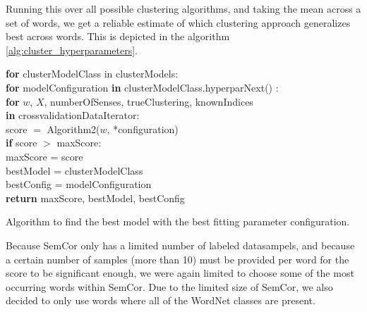 \documentclass[a4paper,12pt,oneside,openright]{report}
\begin{document}
\hfill \break

Running this over all possible clustering algorithms, and taking the mean across a set of words, we get a reliable estimate of which clustering approach generalizes best across words.
This is depicted in the algorithm \ref{alg:cluster_hyperparameters}.

\begin{algorithm}[H]
\SetAlgoLined
{}

\textbf{for} clusterModelClass in clusterModels:  \\
\quad \quad \textbf{for} modelConfiguration \textbf{in} clusterModelClass.hyperparNext() :  \\
\quad \quad \quad \quad \textbf{for} $w$, $X$, numberOfSenses, trueClustering, knownIndices \\
\quad \quad \quad \quad \textbf{in} crossvalidationDataIterator:  \\

\quad \quad \quad \quad \quad \quad score $=$ Algorithm2($w$, *configuration) \\
\quad \quad \quad \quad \quad \quad \textbf{if} score $>$ maxScore: \\
\quad \quad \quad \quad \quad \quad \quad \quad  maxScore = score \\
\quad \quad \quad \quad \quad \quad \quad \quad  bestModel = clusterModelClass \\
\quad \quad \quad \quad \quad \quad \quad \quad  bestConfig = modelConfiguration \\

\textbf{return} maxScore, bestModel, bestConfig
  \label{alg:cluster_hyperparameters}
 \caption{Algorithm to find the best model with the best fitting parameter configuration.}
\end{algorithm}

\hfill \break

Because SemCor only has a limited number of labeled datasampels, and because a certain number of samples (more than 10) must be provided per word for the score to be significant enough, we were again limited to choose some of the most occurring words within SemCor.
Due to the limited size of SemCor, we also decided to only use words where all of the WordNet classes are present.
\end{document}
